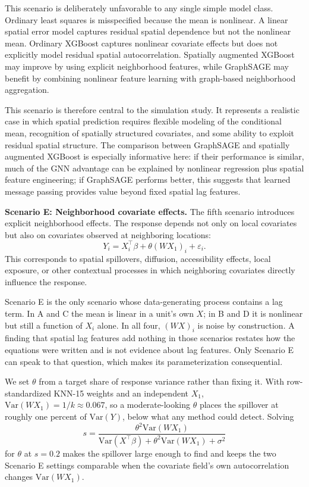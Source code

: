 \documentclass[ASNA, twocolumn]{USG} %
\begin{document}
This scenario is deliberately unfavorable to any single simple model class. Ordinary least squares is misspecified because the mean is nonlinear. A linear spatial error model captures residual spatial dependence but not the nonlinear mean. Ordinary XGBoost captures nonlinear covariate effects but does not explicitly model residual spatial autocorrelation. Spatially augmented XGBoost may improve by using explicit neighborhood features, while GraphSAGE may benefit by combining nonlinear feature learning with graph-based neighborhood aggregation.

This scenario is therefore central to the simulation study. It represents a realistic case in which spatial prediction requires flexible modeling of the conditional mean, recognition of spatially structured covariates, and some ability to exploit residual spatial structure. The comparison between GraphSAGE and spatially augmented XGBoost is especially informative here: if their performance is similar, much of the GNN advantage can be explained by nonlinear regression plus spatial feature engineering; if GraphSAGE performs better, this suggests that learned message passing provides value beyond fixed spatial lag features.

\noindent \textbf{Scenario E: Neighborhood covariate effects.}
The fifth scenario introduces explicit neighborhood effects. The response depends not only on local covariates but also on covariates observed at neighboring locations:
\[ Y_i = X_i^\top\beta + \theta (WX_1)_i + \varepsilon_i. \]
This corresponds to spatial spillovers, diffusion, accessibility effects, local exposure, or other contextual processes in which neighboring covariates directly influence the response.

Scenario E is the only scenario whose data-generating process contains a lag term. In A and C the mean is linear in a unit's own \(X\); in B and D it is nonlinear but still a function of \(X_i\) alone. In all four, \((WX)_i\) is noise by construction. A finding that spatial lag features add nothing in those scenarios restates how the equations were written and is not evidence about lag features. Only Scenario E can speak to that question, which makes its parameterization consequential.

We set \(\theta\) from a target share of response variance rather than fixing it. With row-standardized KNN-15 weights and an independent \(X_1\), \(\mathrm{Var}(WX_1) = 1/k \approx 0.067\), so a moderate-looking \(\theta\) places the spillover at roughly one percent of \(\mathrm{Var}(Y)\), below what any method could detect. Solving
\[
s = \frac{\theta^2 \mathrm{Var}(WX_1)}{\mathrm{Var}(X^\top\beta) + \theta^2\mathrm{Var}(WX_1) + \sigma^2}
\]
for \(\theta\) at \(s=0.2\) makes the spillover large enough to find and keeps the two Scenario E settings comparable when the covariate field's own autocorrelation changes \(\mathrm{Var}(WX_1)\).
\end{document}
